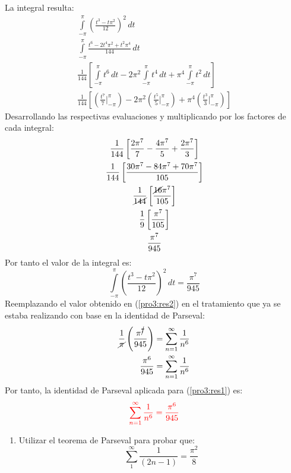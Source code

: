 \begin{multicols}{2}
La integral resulta:
\begin{gather*}
    \int\limits_{-\pi}^{\pi} \left(\frac{t^{3} - t\pi^{2}}{12}\right)^{2} \,dt\\
    \int\limits_{-\pi}^{\pi} \frac{t^{6} - 2t^{4}\pi^{2} + t^{2}\pi^{4}}{144} \,dt\\
    \frac{1}{144} \left[\int\limits_{-\pi}^{\pi} t^{6} \,dt - 2\pi^{2}\int\limits_{-\pi}^{\pi} t^{4} \,dt + \pi^{4}\int\limits_{-\pi}^{\pi} t^{2} \,dt\right]\\
    \frac{1}{144} \left[\left(\frac{t^{7}}{7}\vert_{-\pi}^{\pi}\right) - 2\pi^{2}\left(\frac{t^{5}}{5}\vert_{-\pi}^{\pi}\right) + \pi^{4}\left(\frac{t^{3}}{3}\vert_{-\pi}^{\pi}\right)\right]
\end{gather*}
Desarrollando las respectivas evaluaciones y multiplicando por los factores de cada integral:
\begin{gather*}
    \frac{1}{144} \left[\frac{2\pi^{7}}{7} - \frac{4\pi^{7}}{5} + \frac{2\pi^{7}}{3}\right]\\
    \frac{1}{144} \left[\frac{30\pi^{7} - 84\pi^{7} + 70\pi^{7}}{105}\right]\\
    \frac{1}{\cancel{144}} \left[\frac{\cancel{16}\pi^{7}}{105}\right]\\
    \frac{1}{9} \left[\frac{\pi^{7}}{105}\right]\\
    \frac{\pi^{7}}{945}
\end{gather*}
Por tanto el valor de la integral es:
\begin{equation}
    \int\limits_{-\pi}^{\pi} \left(\frac{t^{3} - t\pi^{2}}{12}\right)^{2} \,dt = \frac{\pi^{7}}{945} \label{pro3:res2}
\end{equation}
Reemplazando el valor obtenido en (\ref{pro3:res2}) en el tratamiento que ya se estaba realizando con base en la identidad de Parseval:
\begin{align*}
    \frac{1}{\cancel{\pi}} \left(\frac{\pi^{\cancel{7}}}{945}\right) &= \sum_{n=1}^{\infty} \frac{1}{n^{6}}\\
    \frac{\pi^{6}}{945} &= \sum_{n=1}^{\infty} \frac{1}{n^{6}}
\end{align*}
Por tanto, la identidad de Parseval aplicada para (\ref{pro3:res1}) es:
\begin{equation}
    \textcolor{rojo}{\sum_{n=1}^{\infty} \frac{1}{n^{6}} = \frac{\pi^{6}}{945}} \label{pro3:res3}
\end{equation}

\begin{enumerate}[leftmargin=15pt, resume]
    \item Utilizar el teorema de Parseval para probar que:
    \begin{equation*}
        \sum_{1}^{\infty} \frac{1}{(2n-1)} = \frac{\pi^{2}}{8}
    \end{equation*}
\end{enumerate}


\end{multicols}
